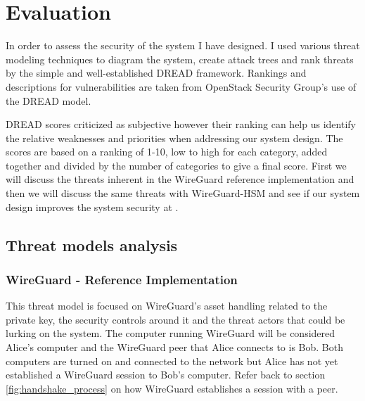 \documentclass [11pt, proquest] {uwthesis}[2020/02/24]
\begin{document}
\chapter {Evaluation}
In order to assess the security of the system I have designed. I used various threat modeling techniques to diagram the system, create attack trees and rank threats by the simple and well-established DREAD framework. Rankings and descriptions for vulnerabilities are taken from OpenStack Security Group's use of the DREAD model\cite{noauthor_securityossa-metrics_2022}. 

DREAD scores criticized as subjective however their ranking can help us identify the relative weaknesses and priorities when addressing our system design. The scores are based on a ranking of 1-10, low to high for each category, added together and divided by the number of categories to give a final score. 
First we will discuss the threats inherent in the WireGuard reference implementation and then we will discuss the same threats with WireGuard-HSM and see if our system design improves the system security at .
\section{Threat models analysis}

\subsection {WireGuard - Reference Implementation}
\label{wg-ref-analysis}
This threat model is focused on WireGuard's asset handling related to the private key, the security controls around it and the threat actors that could be lurking on the system. The computer running WireGuard will be considered Alice's computer and the WireGuard peer that Alice connects to is Bob. Both computers are turned on and connected to the network but Alice has not yet established a WireGuard session to Bob's computer. Refer back to section \ref{fig:handshake_process} on how WireGuard establishes a session with a peer. 
\end{document}
